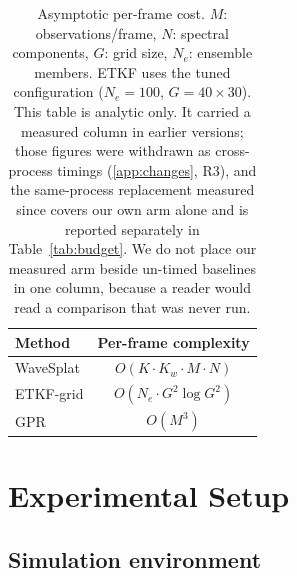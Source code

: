 \documentclass[review]{elsarticle}
\begin{document}
\begin{table}[t]
\centering
\caption{Asymptotic per-frame cost.
$M$: observations/frame, $N$: spectral components,
$G$: grid size, $N_e$: ensemble members.
ETKF uses the tuned configuration ($N_e=100$, $G=40\times30$).
This table is analytic only. It carried a measured column in earlier versions; those
figures were withdrawn as cross-process timings (\ref{app:changes}, R3), and the
same-process replacement measured since covers our own arm alone and is reported
separately in Table~\ref{tab:budget}. We do not place our measured arm beside
un-timed baselines in one column, because a reader would read a comparison that was
never run.}
\label{tab:complexity}
\begin{tabular}{lc}
\toprule
Method & Per-frame complexity \\
\midrule
WaveSplat & $O(K \cdot K_w \cdot M \cdot N)$ \\
ETKF-grid & $O(N_e \cdot G^2 \log G^2)$ \\
GPR       & $O(M^3)$ \\
\bottomrule
\end{tabular}
\end{table}

\section{Experimental Setup}
\label{sec:experiments}

\subsection{Simulation environment}
\end{document}
